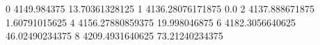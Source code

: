 0 4149.984375 13.70361328125
1 4136.28076171875 0.0
2 4137.888671875 1.60791015625
4 4156.27880859375 19.998046875
6 4182.3056640625 46.02490234375
8 4209.4931640625 73.21240234375
